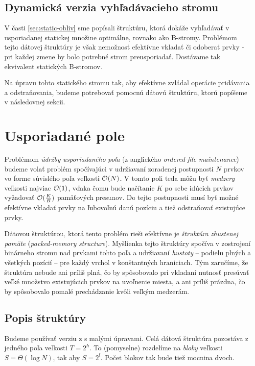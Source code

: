 \subsection{Dynamická verzia vyhľadávacieho stromu} 
V časti \ref{sec:static-obliv} sme popísali štruktúru, ktorá dokáže vyhľadávať v usporiadanej statickej množine optimálne, rovnako ako \aware B-stromy. Problémom tejto dátovej štruktúry je však nemožnosť efektívne vkladať či odoberať prvky - pri každej zmene by bolo potrebné strom preusporiadať. Dostávame tak \obliv ekvivalent statických \aware B-stromov. 

Na úpravu tohto statického stromu tak, aby efektívne zvládal operácie pridávania a odstraňovania, budeme potrebovať pomocnú dátovú štruktúru, ktorú popíšeme v následovnej sekcii.

\section{Usporiadané pole} \label{sec:orderedfile}

Problémom \emph{údržby usporiadaného poľa} (z anglického \emph{ordered-file maintenance}) budeme volať problém spočívajúci v udržiavaní zoradenej postupnosti $N$ prvkov vo forme súvislého poľa veľkosti $\mathcal{O}(N)$. V tomto poli teda môžu byť \emph{medzery} veľkosti najviac $\mathcal{O}(1)$, vďaka čomu bude načítanie $K$ po sebe idúcich prvkov vyžadovať $\mathcal{O}(\frac{K}{B})$ pamäťových presunov. Do tejto postupnosti musí byť možné efektívne vkladať prvky na ľubovoľnú danú pozíciu a tiež odstraňovať existujúce prvky.

Dátovou štruktúrou, ktorá tento problém rieši efektívne je \emph{štruktúra zhustenej pamäte} (\emph{packed-memory structure}). Myšlienka tejto štruktúry spočíva v zostrojení binárneho stromu nad prvkami tohto poľa a  udržiavaní \emph{hustoty} -- podielu plných a všetkých pozícií -- pre každý vrchol v konštantných hraniciach. Tým zaručíme, že štruktúra nebude ani príliš plná, čo by spôsobovalo pri vkladaní nutnosť presúvať veľké množstvo existujúcich prvkov na uvoľnenie miesta, a ani príliš prázdna, čo by spôsobovalo pomalé prechádzanie kvôli veľkým medzerám.

\subsection{Popis štruktúry} \label{sec:of-desc}

Budeme používať verziu z \citep{btreeshort} s malými úpravami. Celá dátová štruktúra pozostáva z jedného poľa veľkosti $T = 2^h$. To (pomyselne) rozdelíme na \emph{bloky} veľkosti $S=\Theta(\log{N})$, tak aby $S = 2^l$. Počet blokov tak bude tiež mocnina dvoch.

